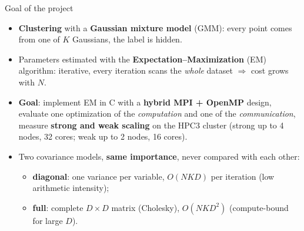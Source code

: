 \documentclass[aspectratio=169,10pt]{beamer}
\begin{document}
\begin{frame}{Goal of the project}
\begin{itemize}
\item \textbf{Clustering} with a \textbf{Gaussian mixture model} (GMM): every point comes from one of $K$ Gaussians, the label is hidden.
\item Parameters estimated with the \textbf{Expectation--Maximization} (EM) algorithm: iterative, every iteration scans the \emph{whole} dataset $\Rightarrow$ cost grows with $N$.
\item \textbf{Goal}: implement EM in C with a \textbf{hybrid MPI + OpenMP} design, evaluate one optimization of the \emph{computation} and one of the \emph{communication}, measure \textbf{strong and weak scaling} on the HPC3 cluster (strong up to 4 nodes, 32 cores; weak up to 2 nodes, 16 cores).
\item Two covariance models, \textbf{same importance}, never compared with each other:
  \begin{itemize}
  \item \textbf{diagonal}: one variance per variable, $O(NKD)$ per iteration (low arithmetic intensity);
  \item \textbf{full}: complete $D\times D$ matrix (Cholesky), $O(NKD^2)$ (compute-bound for large $D$).
  \end{itemize}
\end{itemize}
\end{frame}
\end{document}
